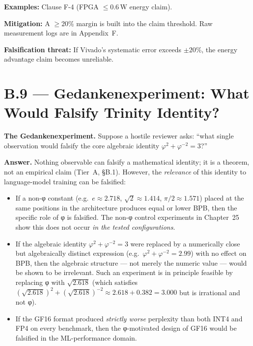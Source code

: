 \textbf{Examples:} Clause F-4 (FPGA $\leq 0.6$\,W energy claim).

\textbf{Mitigation:} A $\geq 20\%$ margin is built into the claim threshold.
Raw measurement logs are in Appendix~F.

\textbf{Falsification threat:} If Vivado's systematic error exceeds $\pm 20\%$,
the energy advantage claim becomes unreliable.

\section*{B.9 — Gedankenexperiment: What Would Falsify Trinity Identity?}
\label{sec:gedanken}

\noindent\textbf{The Gedankenexperiment.}  Suppose a hostile reviewer asks:
``what single observation would falsify the core algebraic identity
$\varphi^{2} + \varphi^{-2} = 3$?''

\medskip

\noindent\textbf{Answer.}  Nothing observable can falsify a mathematical
identity; it is a theorem, not an empirical claim (Tier~A, §B.1).  However,
the \emph{relevance} of this identity to language-model training can be
falsified:

\begin{itemize}
  \item If a non-φ constant (e.g.\ $e \approx 2.718$, $\sqrt{2} \approx 1.414$,
    $\pi/2 \approx 1.571$) placed at the same positions in the architecture
    produces equal or lower BPB, then the specific role of φ is falsified.
    The non-φ control experiments in Chapter~25 show this does not occur
    \emph{in the tested configurations}.

  \item If the algebraic identity $\varphi^{2} + \varphi^{-2} = 3$ were
    replaced by a numerically close but algebraically distinct expression
    (e.g.\ $\varphi^{2} + \varphi^{-2} = 2.99$) with no effect on BPB,
    then the algebraic structure — not merely the numeric value — would be
    shown to be irrelevant.  Such an experiment is in principle feasible by
    replacing φ with $\sqrt{2.618}$ (which satisfies
    $(\sqrt{2.618})^{2} + (\sqrt{2.618})^{-2} \approx 2.618 + 0.382 = 3.000$
    but is irrational and not φ).

  \item If the GF16 format produced \emph{strictly worse} perplexity than
    both INT4 and FP4 on every benchmark, then the φ-motivated design of GF16
    would be falsified in the ML-performance domain.
\end{itemize}

